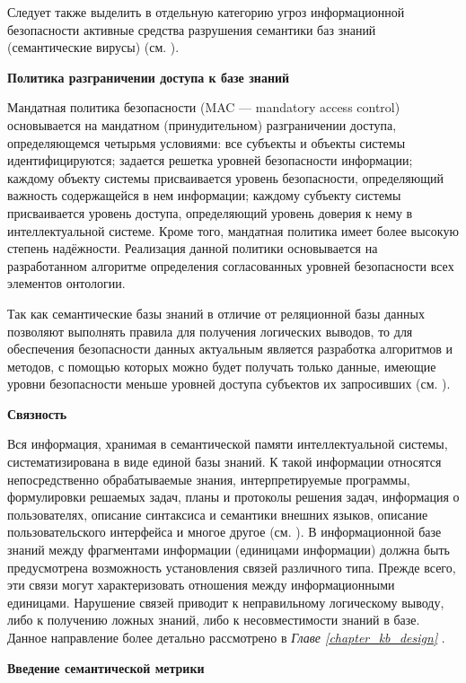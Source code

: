 Следует также выделить в отдельную категорию угроз информационной безопасности активные средства разрушения семантики баз знаний (семантические вирусы) (см. ).

\textbf{Политика разграничении доступа к базе знаний}

Мандатная политика безопасности (MAC --- mandatory access control) основывается на мандатном (принудительном) разграничении доступа, определяющемся четырьмя условиями: все субъекты и объекты системы идентифицируются; задается решетка уровней безопасности информации; каждому объекту системы присваивается уровень безопасности, определяющий важность содержащейся в нем информации; каждому субъекту системы присваивается уровень доступа, определяющий уровень доверия к нему в интеллектуальной системе. Кроме того, мандатная политика имеет более высокую степень надёжности. Реализация данной политики основывается на разработанном алгоритме определения согласованных уровней безопасности всех элементов онтологии.

Так как семантические базы знаний в отличие от реляционной базы данных позволяют выполнять правила для получения логических выводов, то для обеспечения безопасности данных актуальным является разработка алгоритмов и методов, с помощью которых можно будет получать только данные, имеющие уровни безопасности меньше уровней доступа субъектов их запросивших (см. ).

\textbf{Связность}

Вся информация, хранимая в семантической памяти интеллектуальной системы, систематизирована в виде единой базы знаний. К такой информации относятся непосредственно обрабатываемые знания, интерпретируемые программы, формулировки решаемых задач, планы и протоколы решения задач, информация о пользователях, описание синтаксиса и семантики внешних языков, описание пользовательского интерфейса и многое другое (см. ). В информационной базе знаний между фрагментами информации (единицами информации) должна быть предусмотрена возможность установления связей различного типа. Прежде всего, эти связи могут характеризовать отношения между информационными единицами. Нарушение связей приводит к неправильному логическому выводу, либо к получению ложных знаний, либо к несовместимости знаний в базе. Данное направление более детально рассмотрено в \textit{Главе \ref{chapter_kb_design} }.

\textbf{Введение семантической метрики}

